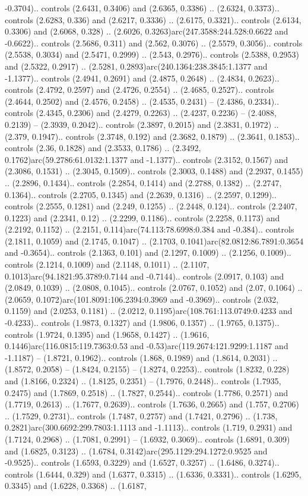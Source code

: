 -0.3704).. controls (2.6431, 0.3406) and (2.6365, 0.3386) .. (2.6324, 0.3373).. controls (2.6283, 0.336) and (2.6217, 0.3336) .. (2.6175, 0.3321).. controls (2.6134, 0.3306) and (2.6068, 0.328) .. (2.6026, 0.3263)arc(247.3588:244.528:0.6622 and -0.6622).. controls (2.5686, 0.311) and (2.562, 0.3076) .. (2.5579, 0.3056).. controls (2.5538, 0.3034) and (2.5471, 0.2999) .. (2.543, 0.2976).. controls (2.5388, 0.2953) and (2.5322, 0.2917) .. (2.5281, 0.2893)arc(240.1364:238.3845:1.1377 and -1.1377).. controls (2.4941, 0.2691) and (2.4875, 0.2648) .. (2.4834, 0.2623).. controls (2.4792, 0.2597) and (2.4726, 0.2554) .. (2.4685, 0.2527).. controls (2.4644, 0.2502) and (2.4576, 0.2458) .. (2.4535, 0.2431) -- (2.4386, 0.2334).. controls (2.4345, 0.2306) and (2.4279, 0.2263) .. (2.4237, 0.2236) -- (2.4088, 0.2139) -- (2.3939, 0.2042).. controls (2.3897, 0.2015) and (2.3831, 0.1972) .. (2.379, 0.1947).. controls (2.3748, 0.192) and (2.3682, 0.1879) .. (2.3641, 0.1853).. controls (2.36, 0.1828) and (2.3533, 0.1786) .. (2.3492, 0.1762)arc(59.2786:61.0132:1.1377 and -1.1377).. controls (2.3152, 0.1567) and (2.3086, 0.1531) .. (2.3045, 0.1509).. controls (2.3003, 0.1488) and (2.2937, 0.1455) .. (2.2896, 0.1434).. controls (2.2854, 0.1414) and (2.2788, 0.1382) .. (2.2747, 0.1364).. controls (2.2705, 0.1345) and (2.2639, 0.1316) .. (2.2597, 0.1299).. controls (2.2555, 0.1281) and (2.249, 0.1255) .. (2.2448, 0.124).. controls (2.2407, 0.1223) and (2.2341, 0.12) .. (2.2299, 0.1186).. controls (2.2258, 0.1173) and (2.2192, 0.1152) .. (2.2151, 0.114)arc(74.113:78.6998:0.384 and -0.384).. controls (2.1811, 0.1059) and (2.1745, 0.1047) .. (2.1703, 0.1041)arc(82.0812:86.7891:0.3654 and -0.3654).. controls (2.1363, 0.101) and (2.1297, 0.1009) .. (2.1256, 0.1009).. controls (2.1214, 0.1009) and (2.1148, 0.1011) .. (2.1107, 0.1013)arc(94.1821:95.3789:0.7144 and -0.7144).. controls (2.0917, 0.103) and (2.0849, 0.1039) .. (2.0808, 0.1045).. controls (2.0767, 0.1052) and (2.07, 0.1064) .. (2.0659, 0.1072)arc(101.8091:106.2394:0.3969 and -0.3969).. controls (2.032, 0.1159) and (2.0253, 0.1181) .. (2.0212, 0.1195)arc(108.761:113.0749:0.4233 and -0.4233).. controls (1.9873, 0.1327) and (1.9806, 0.1357) .. (1.9765, 0.1375).. controls (1.9724, 0.1395) and (1.9658, 0.1427) .. (1.9616, 0.1446)arc(116.0815:119.7363:0.53 and -0.53)arc(119.2674:121.9299:1.1187 and -1.1187) -- (1.8721, 0.1962).. controls (1.868, 0.1989) and (1.8614, 0.2031) .. (1.8572, 0.2058) -- (1.8424, 0.2155) -- (1.8274, 0.2253).. controls (1.8232, 0.228) and (1.8166, 0.2324) .. (1.8125, 0.2351) -- (1.7976, 0.2448).. controls (1.7935, 0.2475) and (1.7869, 0.2518) .. (1.7827, 0.2544).. controls (1.7786, 0.2571) and (1.7719, 0.2613) .. (1.7677, 0.2639).. controls (1.7636, 0.2665) and (1.757, 0.2706) .. (1.7529, 0.2731).. controls (1.7487, 0.2757) and (1.7421, 0.2796) .. (1.738, 0.2821)arc(300.6692:299.7803:1.1113 and -1.1113).. controls (1.719, 0.2931) and (1.7124, 0.2968) .. (1.7081, 0.2991) -- (1.6932, 0.3069).. controls (1.6891, 0.309) and (1.6825, 0.3123) .. (1.6784, 0.3142)arc(295.1129:294.1272:0.9525 and -0.9525).. controls (1.6593, 0.3229) and (1.6527, 0.3257) .. (1.6486, 0.3274).. controls (1.6444, 0.329) and (1.6377, 0.3315) .. (1.6336, 0.3331).. controls (1.6295, 0.3345) and (1.6228, 0.3368) .. (1.6187, 